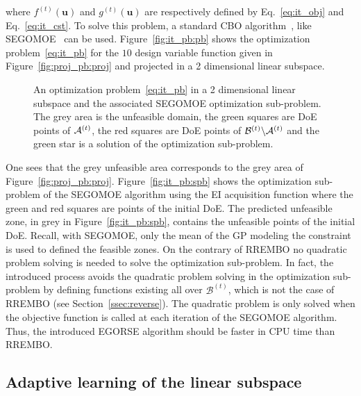 where $f^{(t)}(\bm{u})$ and $g^{(t)}(\bm{u})$ are respectively defined by Eq.~\eqref{eq:it_obj} and Eq.~\eqref{eq:it_cst}.
To solve this problem, a standard CBO algorithm~\cite{frazierTutorialBayesianOptimization2018,priemOptimisationBayesienneSous2020,ShahriariTakingHumanOut2016}, like SEGOMOE~\cite{bartoliAdaptiveModelingStrategy2019,priemUpperTrustBound2020c} can be used.
Figure~\ref{fig:it_pb:pb} shows the optimization problem~\eqref{eq:it_pb} for the $10$ design variable function given in Figure~\ref{fig:proj_pb:proj} and projected in a 2 dimensional linear subspace. 
\begin{figure}[!htb]
    \centering
    \caption{An optimization problem~\eqref{eq:it_pb} in a 2 dimensional linear subspace and the associated SEGOMOE optimization sub-problem. The grey area is the unfeasible domain, the green squares are DoE points of ${\mathcal{A}}^{(t)}$, the red squares are DoE points of $\mathcal{B}^{(t)} \backslash {\mathcal{A}}^{(t)}$ and the green star is a solution of the optimization sub-problem.}
    \label{fig:it_pb}
\end{figure}
One sees that the grey unfeasible area corresponds to the grey area of Figure~\ref{fig:proj_pb:proj}.
Figure~\ref{fig:it_pb:spb} shows the optimization sub-problem of the SEGOMOE algorithm using the EI acquisition function where the green and red squares are points of the initial DoE.
The predicted unfeasible zone, in grey in Figure~\ref{fig:it_pb:spb}, contains the unfeasible points of the initial DoE. 
Recall, with SEGOMOE, only the mean of the GP modeling the constraint is used to defined the feasible zones.
On the contrary of RREMBO no quadratic problem solving is needed to solve the optimization sub-problem. 
In fact, the introduced process avoids the quadratic problem solving in the optimization sub-problem by defining functions existing all over $\mathcal{B}^{(t)}$, which is not the case of RREMBO (see Section~\ref{ssec:reverse}).
The quadratic problem is only solved when the objective function is called at each iteration of the SEGOMOE algorithm.
Thus, the introduced EGORSE algorithm should be faster in CPU time than RREMBO.

\subsection{Adaptive learning of the linear subspace}

